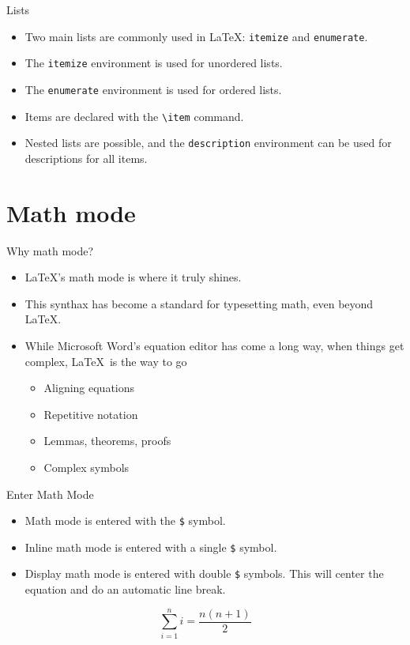 \documentclass[t,12pt,xcolor=dvipsnames]{beamer}
\begin{document}
\begin{frame}{Lists}
    \begin{itemize}
        \item Two main lists are commonly used in \LaTeX: \texttt{itemize} and \texttt{enumerate}.
        \item The \texttt{itemize} environment is used for unordered lists.
        \item The \texttt{enumerate} environment is used for ordered lists.
        \item Items are declared with the \texttt{\textbackslash item} command.
        \item Nested lists are possible, and the \texttt{description} environment can be used for descriptions for all items.
    \end{itemize}
\end{frame}

\section{Math mode}

\begin{frame}{Why math mode?}
    \begin{itemize}
        \item \LaTeX's math mode is where it truly shines.
        \item This synthax has become a standard for typesetting math, even beyond \LaTeX.
        \item While Microsoft Word's equation editor has come a long way, when things get complex, \LaTeX \ is the way to go
        \begin{itemize}
            \item Aligning equations
            \item Repetitive notation
            \item Lemmas, theorems, proofs
            \item Complex symbols
        \end{itemize}
    \end{itemize}
\end{frame}

\begin{frame}{Enter Math Mode}
    \begin{itemize}
        \item Math mode is entered with the \texttt{\$} symbol.
        \item Inline math mode is entered with a single \texttt{\$} symbol.
        \item Display math mode is entered with double \texttt{\$} symbols. This will center the equation and do an automatic line break.
    \end{itemize}
            $$ \sum_{i=1}^{n} i = \frac{n(n+1)}{2} $$
\end{frame}
\end{document}
